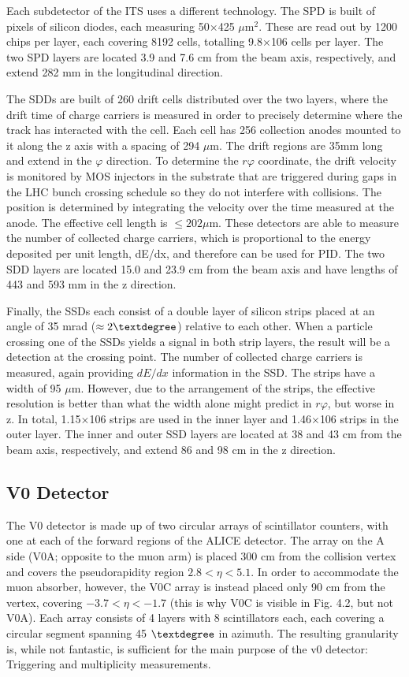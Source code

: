 Each subdetector of the ITS uses a different technology. The SPD is built of pixels of silicon diodes, each measuring 50×425 $\mu$m$^2$. These are read out by 1200 chips per layer, each covering 8192 cells, totalling 9.8$\times$106 cells per layer. The two SPD layers are located 3.9 and 7.6 cm from the beam axis, respectively, and extend 282 mm in the longitudinal direction.

The SDDs are built of 260 drift cells distributed over the two layers, where the drift time of charge carriers is measured in order to precisely determine where the track has interacted with the cell. Each cell has 256 collection anodes mounted to it along the z axis with a spacing of 294 $\mu$m. The drift regions are 35mm long and extend in the $\varphi$ direction. To determine the $r\varphi$ coordinate, the drift velocity is monitored by MOS injectors in the substrate that are triggered during gaps in the LHC bunch crossing schedule so they do not interfere with collisions. The position is determined by integrating the velocity over the time measured at the anode. The effective cell length is $\leq 202\mu$m. These detectors are able to measure the number of collected charge carriers, which is proportional to the energy deposited per unit length, dE/dx, and therefore can be used for PID. The two SDD layers are located 15.0 and 23.9 cm from the beam axis and have lengths of 443 and 593 mm in the z direction.

Finally, the SSDs each consist of a double layer of silicon strips placed at an angle of 35 mrad ($\approx 2\textdegree$) relative to each other. When a particle crossing one of the SSDs yields a signal in both strip layers, the result will be a detection at the crossing point. The number of collected charge carriers is measured, again providing $dE/dx$ information in the SSD. The strips have a width of 95 $\mu$m. However, due to the arrangement of the strips, the effective resolution is better than what the width alone might predict in $r\varphi$, but worse in z. In total, 1.15$\times$106 strips are used in the inner layer and 1.46$\times$106 strips in the outer layer. The inner and outer SSD layers are located at 38 and 43 cm from the beam axis, respectively, and extend 86 and 98 cm in the z direction.


\subsection{V0 Detector}
The V0 detector is made up of two circular arrays of scintillator counters, with one at each of the forward regions of the ALICE detector. The array on the A side (V0A; opposite to the muon arm) is placed 300 cm from the collision vertex and covers the pseudorapidity region $2.8 < \eta < 5.1$. In order to accommodate the muon absorber, however, the V0C array is instead placed only 90 cm from the vertex, covering $-3.7 < \eta < -1.7$ (this is why V0C is visible in Fig. 4.2, but not V0A). Each array consists of 4 layers with 8 scintillators each, each covering a circular segment spanning 45 $\textdegree$ in azimuth. The resulting granularity is, while not fantastic, is sufficient for the main purpose of the v0 detector: Triggering and multiplicity measurements.

